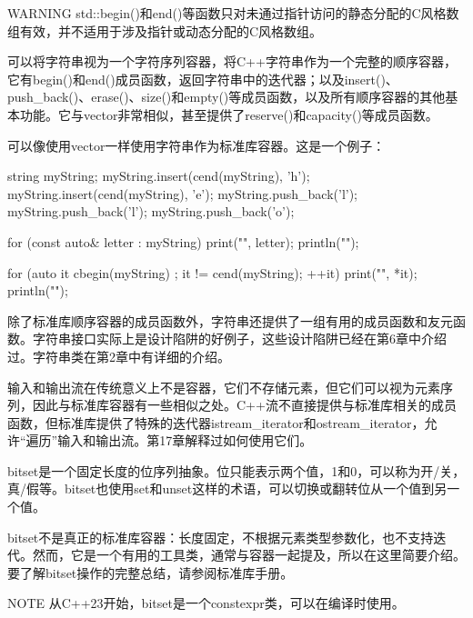 \begin{myWarning}{WARNING}
std::begin()和end()等函数只对未通过指针访问的静态分配的C风格数组有效，并不适用于涉及指针或动态分配的C风格数组。
\end{myWarning}


可以将字符串视为一个字符序列容器，将C++字符串作为一个完整的顺序容器，它有begin()和end()成员函数，返回字符串中的迭代器；以及insert()、push\_back()、erase()、size()和empty()等成员函数，以及所有顺序容器的其他基本功能。它与vector非常相似，甚至提供了reserve()和capacity()等成员函数。

可以像使用vector一样使用字符串作为标准库容器。这是一个例子：

\begin{cpp}
string myString;
myString.insert(cend(myString), 'h');
myString.insert(cend(myString), 'e');
myString.push_back('l');
myString.push_back('l');
myString.push_back('o');

for (const auto& letter : myString) {
    print("{}", letter);
}
println("");

for (auto it { cbegin(myString) }; it != cend(myString); ++it) {
    print("{}", *it);
}
println("");
\end{cpp}

除了标准库顺序容器的成员函数外，字符串还提供了一组有用的成员函数和友元函数。字符串接口实际上是设计陷阱的好例子，这些设计陷阱已经在第6章中介绍过。字符串类在第2章中有详细的介绍。


输入和输出流在传统意义上不是容器，它们不存储元素，但它们可以视为元素序列，因此与标准库容器有一些相似之处。C++流不直接提供与标准库相关的成员函数，但标准库提供了特殊的迭代器istream\_iterator和ostream\_iterator，允许“遍历”输入和输出流。第17章解释过如何使用它们。


bitset是一个固定长度的位序列抽象。位只能表示两个值，1和0，可以称为开/关，真/假等。bitset也使用set和unset这样的术语，可以切换或翻转位从一个值到另一个值。

bitset不是真正的标准库容器：长度固定，不根据元素类型参数化，也不支持迭代。然而，它是一个有用的工具类，通常与容器一起提及，所以在这里简要介绍。要了解bitset操作的完整总结，请参阅标准库手册。


\begin{myNotic}{NOTE}
从C++23开始，bitset是一个constexpr类，可以在编译时使用。
\end{myNotic}

